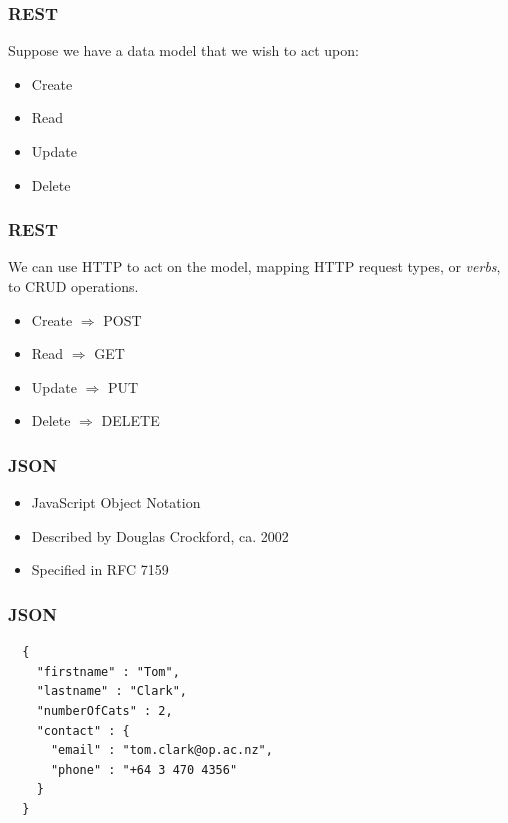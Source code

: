 \documentclass[10pt]{beamer}
\begin{document}
\begin{frame}
  \frametitle{REST}

 Suppose we have a data model that we wish to act upon:
 \begin{itemize}
  \item Create
  \item Read
  \item Update
  \item Delete
 \end{itemize}

\end{frame}


\begin{frame}
  \frametitle{REST}

 We can use HTTP to act on the model, mapping HTTP request types, or 
 \emph{verbs}, to CRUD operations.
 \begin{itemize}
  \item Create $\Rightarrow$ POST
  \item Read $\Rightarrow$ GET
  \item Update $\Rightarrow$ PUT
  \item Delete $\Rightarrow$ DELETE
 \end{itemize}

\end{frame}



\begin{frame}
  \frametitle{JSON}

 \begin{itemize}
  \item JavaScript Object Notation
  \item Described by Douglas Crockford, ca. 2002
  \item Specified in RFC 7159
 \end{itemize}

\end{frame}



\begin{frame}[fragile]
  \frametitle{JSON}

 \begin{verbatim}
  {
    "firstname" : "Tom",
    "lastname" : "Clark",
    "numberOfCats" : 2,
    "contact" : {
      "email" : "tom.clark@op.ac.nz",
      "phone" : "+64 3 470 4356"
    }
  }
 \end{verbatim}

\end{frame}
\end{document}
